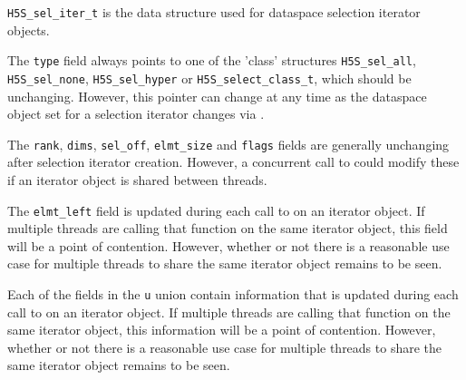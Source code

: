 \documentclass[../HDF5_RFC.tex]{subfiles}
\begin{document}
\texttt{H5S\_sel\_iter\_t} is the data structure used for dataspace selection iterator objects.

The \texttt{type} field always points to one of the 'class' structures \texttt{H5S\_sel\_all},
\texttt{H5S\_sel\_none}, \texttt{H5S\_sel\_hyper} or \texttt{H5S\_select\_class\_t}, which
should be unchanging. However, this pointer can change at any time as the dataspace object
set for a selection iterator changes via .

The \texttt{rank}, \texttt{dims}, \texttt{sel\_off}, \texttt{elmt\_size} and \texttt{flags}
fields are generally unchanging after selection iterator creation. However, a concurrent call
to  could modify these if an iterator object is shared
between threads.

The \texttt{elmt\_left} field is updated during each call to 
on an iterator object. If multiple threads are calling that function on the same iterator object,
this field will be a point of contention. However, whether or not there is a reasonable use case
for multiple threads to share the same iterator object remains to be seen.

Each of the fields in the \texttt{u} union contain information that is updated during each call to
 on an iterator object. If multiple threads are
calling that function on the same iterator object, this information will be a point of contention.
However,  whether or not there is a reasonable use case for multiple threads to share the same
iterator object remains to be seen.
\end{document}

